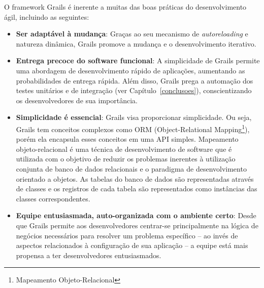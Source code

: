\vspace{0.2cm}

O  framework Grails é  inerente a  muitas das  boas práticas  do desenvolvimento
ágil, incluindo as seguintes:

\begin{itemize}

\vspace{0.2cm}
\item  {\bf  Ser  adaptável  à   mudança}:  Graças  ao  seu  mecanismo  de  {\it
  autoreloading}   e  natureza   dinâmica,  Grails   promove  a   mudança   e  o
  desenvolvimento iterativo.

\vspace{0.2cm}
\item  {\bf Entrega  precoce do  software funcional}:  A simplicidade  de Grails
  permite uma  abordagem de desenvolvimento rápido de  aplicações, aumentando as
  probabilidades de  entrega rápida.  Além  disso, Grails prega a  automação dos
  testes   unitários   e    de   integração   (ver   Capítulo~\ref{conclusoes}),
  conscientizando os desenvolvedores de sua importância.

\vspace{0.2cm}
\item {\bf Simplicidade é  essencial}: Grails visa proporcionar simplicidade. Ou
  seja,   Grails   tem   conceitos   complexos   como   ORM   (Object-Relational
  Mapping\footnote{Mapeamento  Objeto-Relacional}),  porém  ela encapsula  esses
  conceitos em  uma API simples.  Mapeamento objeto-relacional é uma  técnica de
  desenvolvimento  de software  que é  utilizada com  o objetivo  de  reduzir os
  problemas inerentes  à utilização conjunta de  banco de dados  relacionais e o
  paradigma de desenvolvimento orientado a objetos. As tabelas do banco de dados
  são  representadas  através de  classes  e os  registros  de  cada tabela  são
  representados como instâncias das classes correspondentes.

\vspace{0.2cm}
\item {\bf Equipe entusiasmada, auto-organizada com o ambiente certo}: Desde que
  Grails  permite aos  desenvolvedores  centrar-se principalmente  na lógica  de
  negócios  necessários para  resolver um  problema  específico --  ao invés  de
  aspectos relacionados  à configuração de sua  aplicação -- a  equipe está mais
  propensa a ter desenvolvedores entusiasmados.

\end{itemize}

